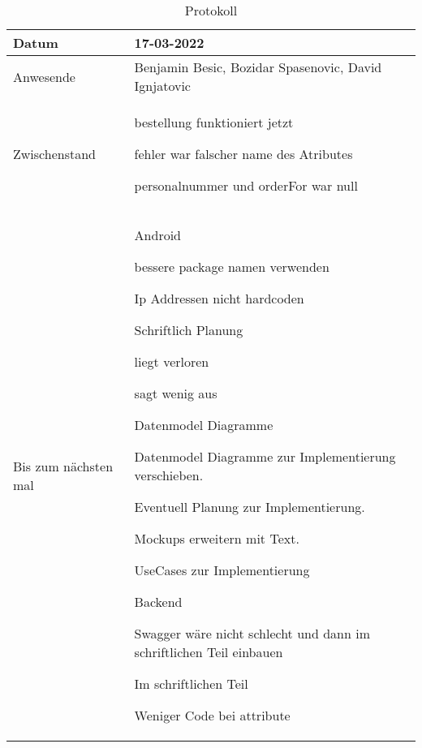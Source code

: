 \begin{table}
    \begin{tabular}{ |p{3cm}|p{10cm}|   }
        \hline
        Datum & 17-03-2022\\
        \hline
        Anwesende & Benjamin Besic, Bozidar Spasenovic, David Ignjatovic\\

        \hline
        Zwischenstand& 



        bestellung funktioniert jetzt

        fehler war falscher name des Atributes

        personalnummer und orderFor war null



    \\
        \hline
        Bis zum nächsten mal &  Android

        bessere package namen verwenden
    
        Ip Addressen nicht hardcoden
    
     Schriftlich
     Planung
    
        liegt verloren
    
        sagt wenig aus
    
        Datenmodel Diagramme
    
        Datenmodel Diagramme zur Implementierung verschieben.
    
        Eventuell Planung zur Implementierung.
    
        Mockups erweitern mit Text.
    
        UseCases zur Implementierung
    
     Backend
    
        Swagger wäre nicht schlecht und dann im schriftlichen Teil einbauen
    
        Im schriftlichen Teil
    
            Weniger Code bei attribute
    
    \\
        \hline
    \end{tabular}
    \caption{Protokoll}
    \label{tab:my_label}
\end{table}
